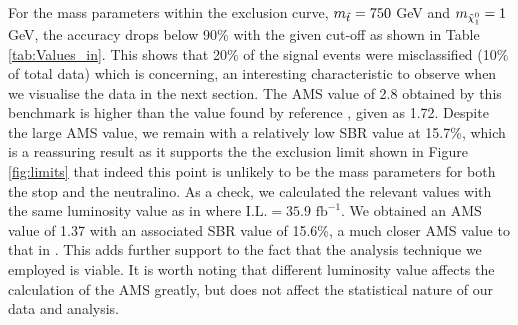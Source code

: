 \indent For the mass parameters within the exclusion curve, $m_{\Tilde{t}} = 750$ GeV and $m_{\Tilde{\chi}_1^0} = 1$ GeV, the accuracy drops below 90\% with the given cut-off as shown in Table \ref{tab:Values_in}. This shows that 20\% of the signal events were misclassified (10\% of total data) which is concerning, an interesting characteristic to observe when we visualise the data in the next section. The AMS value of 2.8 obtained by this benchmark is higher than the value found by reference \cite{roxlo2018opening}, given as 1.72. Despite the large AMS value, we remain with a relatively low SBR value at 15.7\%, which is a reassuring result as it supports the the exclusion limit shown in Figure \ref{fig:limits} that indeed this point is unlikely to be the mass parameters for both the stop and the neutralino. As a check, we calculated the relevant values with the same luminosity value as in \cite{roxlo2018opening} where $\text{I.L.}=35.9\text{ fb}^{-1}$. We obtained an AMS value of 1.37 with an associated SBR value of 15.6\%, a much closer AMS value to that in \cite{roxlo2018opening}. This adds further support to the fact that the analysis technique we employed is viable. It is worth noting that different luminosity value affects the calculation of the AMS greatly, but does not affect the statistical nature of our data and analysis. \\

